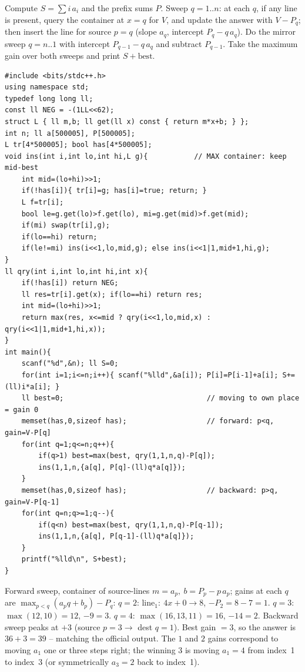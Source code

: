 Compute \(S=\sum i\,a_i\) and the prefix sums \(P\).  Sweep \(q=1..n\): at each
\(q\), if any line is present, query the container at \(x=q\) for \(V\), and
update the answer with \(V-P_q\); then insert the line for source \(p=q\)
(slope \(a_q\), intercept \(P_q-q\,a_q\)).  Do the mirror sweep \(q=n..1\)
with intercept \(P_{q-1}-q\,a_q\) and subtract \(P_{q-1}\).  Take the maximum
gain over both sweeps and print \(S+\text{best}\).

\begin{lstlisting}[caption={CF 631E: forward sweep and backward sweep, each a Li Chao container of source-lines queried at the destination x=q; answer = original S + best gain}, label={lst:c29-631e}]
#include <bits/stdc++.h>
using namespace std;
typedef long long ll;
const ll NEG = -(1LL<<62);
struct L { ll m,b; ll get(ll x) const { return m*x+b; } };
int n; ll a[500005], P[500005];
L tr[4*500005]; bool has[4*500005];
void ins(int i,int lo,int hi,L g){           // MAX container: keep mid-best
    int mid=(lo+hi)>>1;
    if(!has[i]){ tr[i]=g; has[i]=true; return; }
    L f=tr[i];
    bool le=g.get(lo)>f.get(lo), mi=g.get(mid)>f.get(mid);
    if(mi) swap(tr[i],g);
    if(lo==hi) return;
    if(le!=mi) ins(i<<1,lo,mid,g); else ins(i<<1|1,mid+1,hi,g);
}
ll qry(int i,int lo,int hi,int x){
    if(!has[i]) return NEG;
    ll res=tr[i].get(x); if(lo==hi) return res;
    int mid=(lo+hi)>>1;
    return max(res, x<=mid ? qry(i<<1,lo,mid,x) : qry(i<<1|1,mid+1,hi,x));
}
int main(){
    scanf("%d",&n); ll S=0;
    for(int i=1;i<=n;i++){ scanf("%lld",&a[i]); P[i]=P[i-1]+a[i]; S+=(ll)i*a[i]; }
    ll best=0;                                  // moving to own place = gain 0
    memset(has,0,sizeof has);                   // forward: p<q, gain=V-P[q]
    for(int q=1;q<=n;q++){
        if(q>1) best=max(best, qry(1,1,n,q)-P[q]);
        ins(1,1,n,{a[q], P[q]-(ll)q*a[q]});
    }
    memset(has,0,sizeof has);                   // backward: p>q, gain=V-P[q-1]
    for(int q=n;q>=1;q--){
        if(q<n) best=max(best, qry(1,1,n,q)-P[q-1]);
        ins(1,1,n,{a[q], P[q-1]-(ll)q*a[q]});
    }
    printf("%lld\n", S+best);
}
\end{lstlisting}

\begin{tracebox}[Sample 1: \(a=(4,3,2,5)\), \(S=36\)]
Forward sweep, container of source-lines \(m=a_p,\ b=P_p-p\,a_p\); gains at each
\(q\) are \(\max_{p<q}(a_p q+b_p)-P_q\):
\(q{=}2\): line\(_1{:}\ 4x{+}0\to8\), \(-P_2{=}8{-}7=1\).
\(q{=}3\): \(\max(12,10){=}12\), \(-9=3\).
\(q{=}4\): \(\max(16,13,11){=}16\), \(-14=2\).
Backward sweep peaks at \(+3\) (source \(p{=}3\to\) dest \(q{=}1\)).  Best gain
\(=3\), so the answer is \(36+3=\boxed{39}\) -- matching the official output.  The
\(1\) and \(2\) gains correspond to moving \(a_1\) one or three steps right; the
winning \(3\) is moving \(a_1{=}4\) from index~1 to index~3 (or symmetrically
\(a_3{=}2\) back to index~1).
\end{tracebox}


